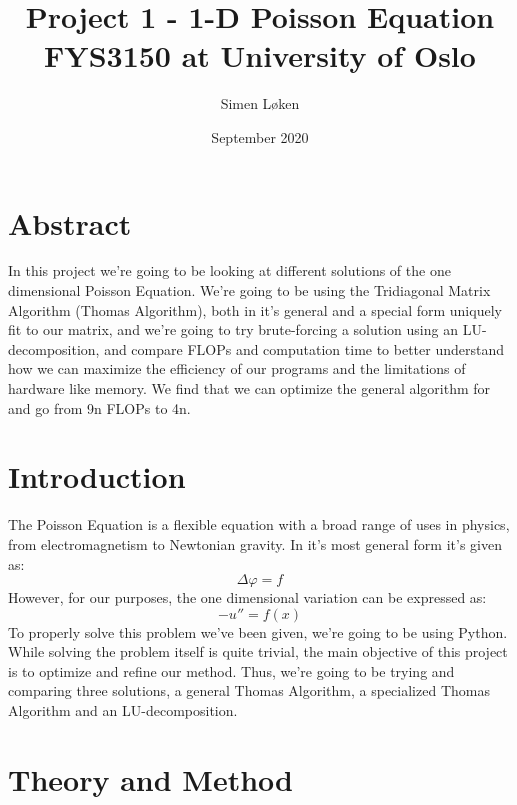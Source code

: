 \documentclass{article}
\title{%
Project 1 - 1-D Poisson Equation \\
\large FYS3150 at University of Oslo}
\author{Simen Løken}
\date{September 2020}
\begin{document}
\maketitle
\section{Abstract}
In this project we're going to be looking at different solutions of the one dimensional Poisson Equation. We're going to be using the Tridiagonal Matrix Algorithm (Thomas Algorithm), both in it's general and a special form uniquely fit to our matrix, and we're going to try brute-forcing a solution using an LU-decomposition, and compare FLOPs and computation time to better understand how we can maximize the efficiency of our programs and the limitations of hardware like memory. We find that we can optimize the general algorithm for and go from 9n FLOPs to 4n.
\section{Introduction}
The Poisson Equation is a flexible equation with a broad range of uses in physics, from electromagnetism to Newtonian gravity. In it's most general form it's given as:
\begin{equation}
    \Delta \varphi = f
\end{equation}
However, for our purposes, the one dimensional variation can be expressed as:
\begin{equation}
    -u'' = f(x)
\end{equation}
To properly solve this problem we've been given, we're going to be using Python. While solving the problem itself is quite trivial, the main objective of this project is to optimize and refine our method. Thus, we're going to be trying and comparing three solutions, a general Thomas Algorithm, a specialized Thomas Algorithm and an LU-decomposition.
\section{Theory and Method}
\end{document}

